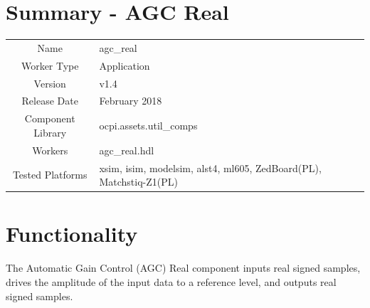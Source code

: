 \documentclass{article}
\author{} %
\date{Version \docVersion} %
\title{\docTitle}
\def\docVersion{1.4}
\def\comp{agc\_real}
\def\Comp{AGC Real}
\begin{document}
\section*{Summary - \Comp}

\begin{center}
\end{center}

\begin{tabular}{|c|M{13.5cm}|}
	\hline
	                  &                                                              \\
	\hline
	Name              & \comp                                                        \\
	\hline
	Worker Type       & Application                                                  \\
	\hline
	Version           & v\docVersion \\
	\hline
	Release Date      & February 2018 \\
	\hline
	Component Library & ocpi.assets.util\_comps                                        \\
	\hline
	Workers           & \comp.hdl                                                    \\
	\hline
	Tested Platforms  & xsim, isim, modelsim, alst4, ml605, ZedBoard(PL), Matchstiq-Z1(PL) \\
	\hline
\end{tabular}

\section*{Functionality}
\begin{flushleft}
	The Automatic Gain Control (AGC) Real component inputs real signed samples, drives the amplitude of the input data to a reference level, and outputs real signed samples.
\end{flushleft}
\end{document}
